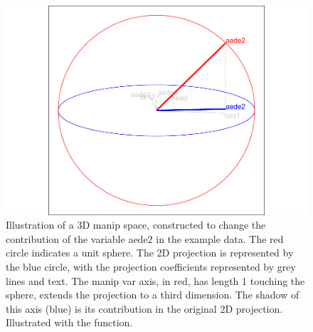 \begin{Schunk}
\begin{figure}

{\centering \includegraphics[width=0.7\linewidth]{spinifex_paper_files/figure-latex/step2-1} 

}

\caption[Illustration of a 3D manip space, constructed to change the contribution of the variable aede2 in the example data]{Illustration of a 3D manip space, constructed to change the contribution of the variable aede2 in the example data. The red circle indicates a unit sphere. The 2D projection is represented by the blue circle, with the projection coefficients represented by grey lines and text. The manip var axis, in red, has length 1 touching the sphere, extends the projection to a third dimension. The shadow of this axis (blue) is its contribution in the original 2D projection. Illustrated with the  function.}\label{fig:step2}
\end{figure}
\end{Schunk}

